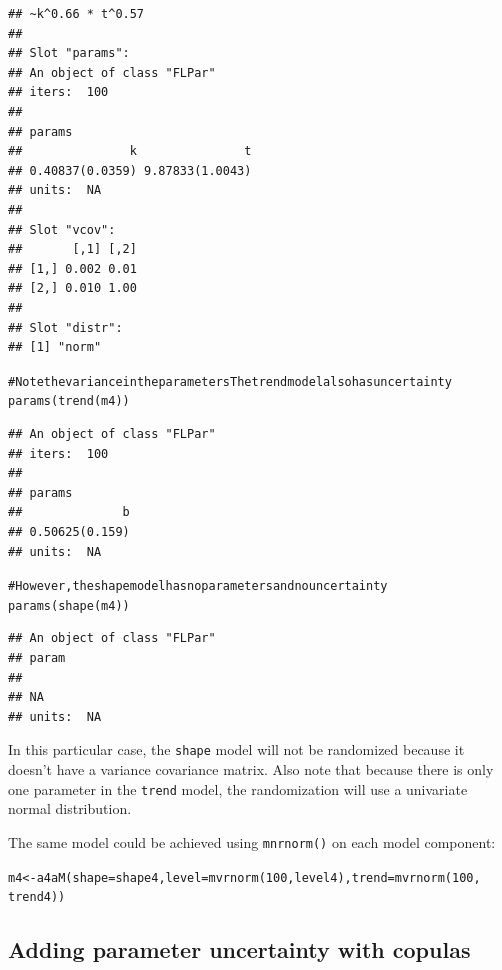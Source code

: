 \documentclass[a4paper,english,10pt]{article}\usepackage[]{graphicx}\usepackage[]{color}
\makeatletter
\newcommand{\hlnum}[1]{\textcolor[rgb]{0.2,0.2,0.2}{#1}}%
\newcommand{\hlcom}[1]{\textcolor[rgb]{0.2,0.267,0.4}{#1}}%
\newcommand{\hlstd}[1]{\textcolor[rgb]{0,0,0}{#1}}%
\newcommand{\hlkwb}[1]{\textcolor[rgb]{0.361,0.506,0.596}{#1}}%
\newcommand{\hlkwc}[1]{\textcolor[rgb]{0.361,0.506,0.596}{#1}}%
\newcommand{\hlkwd}[1]{\textcolor[rgb]{0.361,0.506,0.596}{#1}}%
\newenvironment{kframe}{%
 \def\at@end@of@kframe{}%
 \ifinner\ifhmode%
  \def\at@end@of@kframe{\end{minipage}}%
  \begin{minipage}{\columnwidth}%
 \fi\fi%
 \def\FrameCommand##1{\hskip\@totalleftmargin \hskip-\fboxsep
 \colorbox{shadecolor}{##1}\hskip-\fboxsep
     \hskip-\linewidth \hskip-\@totalleftmargin \hskip\columnwidth}%
 \MakeFramed {\advance\hsize-\width
   \@totalleftmargin\z@ \linewidth\hsize
   \@setminipage}}%
 {\par\unskip\endMakeFramed%
 \at@end@of@kframe}
\newenvironment{knitrout}{}{} %
\newcommand{\code}[1]{{\texttt{#1}}}
\makeatother
\begin{document}
\begin{knitrout}
\begin{kframe}
\begin{verbatim}
## ~k^0.66 * t^0.57
## 
## Slot "params":
## An object of class "FLPar"
## iters:  100 
## 
## params
##               k               t 
## 0.40837(0.0359) 9.87833(1.0043) 
## units:  NA 
## 
## Slot "vcov":
##       [,1] [,2]
## [1,] 0.002 0.01
## [2,] 0.010 1.00
## 
## Slot "distr":
## [1] "norm"
\end{verbatim}
\begin{alltt}
\hlcom{# Note the variance in the parameters The trend model also has uncertainty}
\hlkwd{params}\hlstd{(}\hlkwd{trend}\hlstd{(m4))}
\end{alltt}
\begin{verbatim}
## An object of class "FLPar"
## iters:  100 
## 
## params
##              b 
## 0.50625(0.159) 
## units:  NA
\end{verbatim}
\begin{alltt}
\hlcom{# However, the shape model has no parameters and no uncertainty}
\hlkwd{params}\hlstd{(}\hlkwd{shape}\hlstd{(m4))}
\end{alltt}
\begin{verbatim}
## An object of class "FLPar"
## param
##    
## NA 
## units:  NA
\end{verbatim}
\end{kframe}
\end{knitrout}


In this particular case, the \code{shape} model will not be randomized because it doesn't have a variance covariance matrix. Also note that because there is only one parameter in the \code{trend} model, the randomization will use a univariate normal distribution.

The same model could be achieved using \code{mnrnorm()} on each model component:

\begin{knitrout}
\color{fgcolor}\begin{kframe}
\begin{alltt}
\hlstd{m4} \hlkwb{<-} \hlkwd{a4aM}\hlstd{(}\hlkwc{shape} \hlstd{= shape4,} \hlkwc{level} \hlstd{=} \hlkwd{mvrnorm}\hlstd{(}\hlnum{100}\hlstd{, level4),} \hlkwc{trend} \hlstd{=} \hlkwd{mvrnorm}\hlstd{(}\hlnum{100}\hlstd{,}
    \hlstd{trend4))}
\end{alltt}
\end{kframe}
\end{knitrout}



\subsection{Adding parameter uncertainty with copulas}
\end{document}

